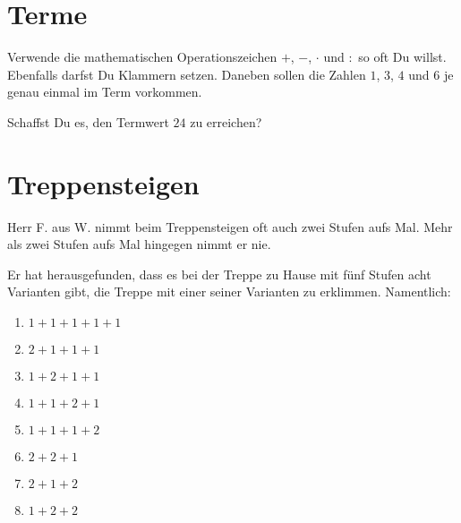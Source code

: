 \section{Terme}
Verwende die mathematischen Operationszeichen $+$, $-$, $\cdot{}$ und
$:$ so oft Du willst. Ebenfalls darfst Du Klammern setzen.
Daneben sollen die Zahlen $1$, $3$, $4$ und $6$ je genau einmal im
Term vorkommen.

Schaffst Du es, den Termwert $24$ zu erreichen?

\section{Treppensteigen}
Herr F. aus W. nimmt beim Treppensteigen oft auch zwei Stufen aufs
Mal. Mehr als zwei Stufen aufs Mal hingegen nimmt er nie.

Er hat herausgefunden, dass es bei der Treppe zu Hause mit fünf Stufen
acht Varianten gibt, die Treppe mit einer seiner Varianten zu
erklimmen. Namentlich:

\begin{enumerate}
\item $1+1+1+1+1$
\item $2 + 1 + 1 + 1$
\item $1 + 2 + 1 + 1$
\item $1 + 1 + 2 + 1$
\item $1 + 1 + 1 + 2$
\item $2+2+1$
\item $2+1+2$
\item $1+2+2$
\end{enumerate}

